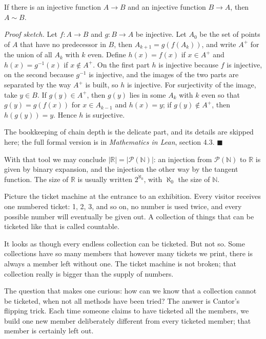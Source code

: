 \begin{proposisi}
If there is an injective function $A \to B$ and an injective function $B \to A$, then
$A \sim B$.
\end{proposisi}
\par\smallskip\noindent\textit{Proof sketch.} Let $f : A \to B$ and $g : B \to A$ be
injective. Let $A_0$ be the set of points of $A$ that have no predecessor in $B$, then
$A_{k+1} = g(f(A_k))$, and write $A^{+}$ for the union of all $A_k$ with $k$ even.
Define $h(x) = f(x)$ if $x \in A^{+}$ and $h(x) = g^{-1}(x)$ if $x \notin A^{+}$. On
the first part $h$ is injective because $f$ is injective, on the second because
$g^{-1}$ is injective, and the images of the two parts are separated by the way
$A^{+}$ is built, so $h$ is injective. For surjectivity of the image, take
$y \in B$. If $g(y) \in A^{+}$, then $g(y)$ lies in some $A_k$ with $k$ even so that
$g(y) = g(f(x))$ for $x \in A_{k-1}$ and $h(x) = y$; if $g(y) \notin A^{+}$, then
$h(g(y)) = y$. Hence $h$ is surjective.

The bookkeeping of chain depth is the delicate part, and its details are skipped here;
the full formal version is in \emph{Mathematics in Lean}, section 4.3.
\hfill$\blacksquare${\parfillskip=0pt\par}

With that tool we may conclude $|\mathbb{R}| = |\mathcal{P}(\mathbb{N})|$: an
injection from $\mathcal{P}(\mathbb{N})$ to $\mathbb{R}$ is given by binary expansion,
and the injection the other way by the tangent function. The size of $\mathbb{R}$ is
usually written $2^{\aleph_0}$, with $\aleph_0$ the size of $\mathbb{N}$.

\begin{untukanak}
Picture the ticket machine at the entrance to an exhibition. Every visitor receives one
numbered ticket: 1, 2, 3, and so on, no number is used twice, and every possible
number will eventually be given out. A collection of things that can be ticketed like
that is called countable.

It looks as though every endless collection can be ticketed. But not so. Some
collections have so many members that however many tickets we print, there is always a
member left without one. The ticket machine is not broken; that collection really is
bigger than the supply of numbers.

The question that makes one curious: how can we know that a collection cannot be
ticketed, when not all methods have been tried? The answer is Cantor's flipping trick.
Each time someone claims to have ticketed all the members, we build one new member
deliberately different from every ticketed member; that member is certainly left out.
\end{untukanak}

